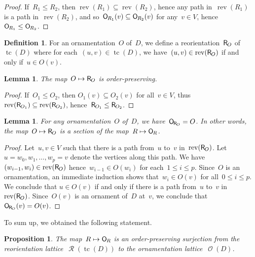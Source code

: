 \documentclass{amsart}
\newtheorem{proposition}[theorem]{Proposition}
\newtheorem{lemma}[theorem]{Lemma}
\theoremstyle{definition}
\newtheorem{definition}[theorem]{Definition}
\renewcommand{\c}[1]{\mathcal{#1}} %
\DeclareMathOperator{\tc}{tc} %
\newcommand{\mymap}[2]{\mathsf{#1}_{\hspace{-.7pt}#2}}
\DeclareMathOperator{\Orn}{\c{O}}  %
\newcommand{\orn}[1]{\mymap{O}{#1}}  %
\DeclareMathOperator{\Reori}{\c{R}}  %
\newcommand{\reori}[1]{\mymap{R}{#1}}  %
\DeclareMathOperator{\rev}{rev} %
\begin{document}
\begin{proof}
If~$R_1 \le R_2$, then $\rev(R_1) \subseteq \rev(R_2)$, hence any path in~$\rev(R_1)$ is a path in~$\rev(R_2)$, and so~$\orn{R_1}(v) \subseteq \orn{R_2}(v)$ for any~$v \in V$, hence~$\orn{R_1} \le \orn{R_2}$.
\end{proof}

\begin{definition}
\label{def:Orn2Reori}
For an ornamentation~$O$ of~$D$, we define a reorientation~$\reori{O}$ of~$\tc(D)$ where for each~$(u,v) \in \tc(D)$, we have~$(u,v) \in \rev(\reori{O})$ if and only if~$u \in O(v)$.
\end{definition}

\begin{lemma}
\label{lem:Orn2Reori1}
The map~$O \mapsto \reori{O}$ is order-preserving.
\end{lemma}

\begin{proof}
If~$O_1 \le O_2$, then $O_1(v) \subseteq O_2(v)$ for all~$v \in V$, thus~$\rev(\reori{O_1}) \subseteq \rev(\reori{O_2})$, hence~${\reori{O_1} \le \reori{O_2}}$.
\end{proof}

\begin{lemma}
\label{lem:Orn2Reori2}
For any ornamentation~$O$ of~$D$, we have~$\orn{\reori{O}} = O$. In other words, the map~${O \mapsto \reori{O}}$ is a section of the map~$R \mapsto \orn{R}$.
\end{lemma}

\begin{proof}
Let~$u,v \in V$ such that there is a path from~$u$ to~$v$ in~$\rev(\reori{O})$.
Let~$u = w_0, w_1, \dots, w_p = v$ denote the vertices along this path.
We have~$(w_{i-1},w_i) \in \rev(\reori{O})$ hence~$w_{i-1} \in O(w_i)$ for each~$1 \le i \le p$.
Since~$O$ is an ornamentation, an immediate induction shows that~$w_i \in O(v)$ for all~$0 \le i \le p$.
We conclude that $u \in O(v)$ if and only if there is a path from~$u$ to~$v$ in~$\rev(\reori{O})$.
Since~$O(v)$ is an ornament of~$D$ at~$v$, we conclude that~$\orn{\reori{O}}(v) = O(v)$.
\end{proof}

To sum up, we obtained the following statement.

\begin{proposition}
\label{prop:Reori2Orn}
The map~$R \mapsto \orn{R}$ is an order-preserving surjection from the reorientation lattice~$\Reori(\tc(D))$ to the ornamentation lattice~$\Orn(D)$.
\end{proposition}
\end{document}
